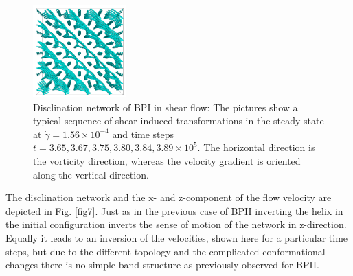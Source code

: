 \documentclass[aps,pre,onecolumn,groupedaddress]{revtex4-1}
\newcommand{\e}[1]{\times10^{#1}}
\begin{document}
\begin{figure}[h]
\includegraphics[width=0.32\textwidth]{disc-389k_run914.png}
\caption{Disclination network of BPI in shear flow: The pictures show a typical sequence of shear-induced transformations in the steady state at $\dot{\gamma}=1.56\e{-4}$ and time steps $t=3.65, 3.67,3.75,3.80,3.84,3.89\e{5}$. The horizontal direction is the vorticity direction, whereas the velocity gradient is oriented along the vertical direction.}
\label{bp1-med}
\end{figure}

The disclination network and the x- and z-component of the flow velocity are depicted in Fig. \ref{fig7}.
Just as in the previous case of BPII inverting the helix in the initial configuration inverts the sense of motion of the network in z-direction.
Equally it leads to an inversion of the velocities, shown here for a particular time steps, but due to the different topology and the complicated conformational changes there is no simple band structure as previously observed for BPII. 
\end{document}
